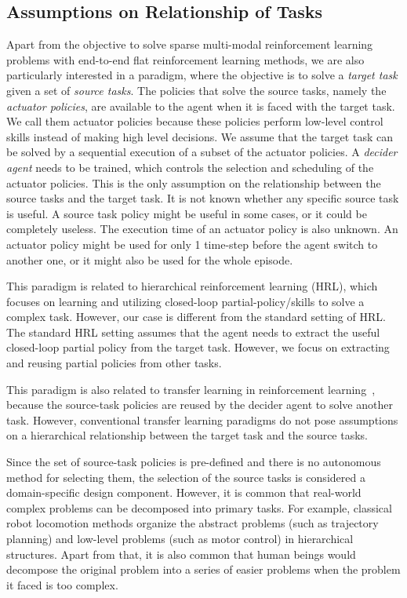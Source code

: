\subsection{Assumptions on Relationship of Tasks}
Apart from the objective to solve sparse multi-modal reinforcement learning problems with end-to-end flat reinforcement learning methods, we are also particularly interested in a paradigm, where the objective is to solve a \textit{target task} given a set of \textit{source tasks}. The policies that solve the source tasks, namely the \textit{actuator policies}, are available to the agent when it is faced with the target task. We call them actuator policies because these policies perform low-level control skills instead of making high level decisions. We assume that the target task can be solved by a sequential execution of a subset of the actuator policies. A \textit{decider agent} needs to be trained, which controls the selection and scheduling of the actuator policies. This is the only assumption on the relationship between the source tasks and the target task. It is not known whether any specific source task is useful. A source task policy might be useful in some cases, or it could be completely useless. The execution time of an actuator policy is also unknown. An actuator policy might be used for only 1 time-step before the agent switch to another one, or it might also be used for the whole episode.

This paradigm is related to hierarchical reinforcement learning (HRL), which focuses on learning and utilizing closed-loop partial-policy/skills to solve a complex task. However, our case is different from the standard setting of HRL. The standard HRL setting assumes that the agent needs to extract the useful closed-loop partial policy from the target task. However, we focus on extracting and reusing partial policies from other tasks.

This paradigm is also related to transfer learning in reinforcement learning~\cite{taylor2009transfer}, because the source-task policies are reused by the decider agent to solve another task. However, conventional transfer learning paradigms do not pose assumptions on a hierarchical relationship between the target task and the source tasks.


Since the set of source-task policies is pre-defined and there is no autonomous method for selecting them, the selection of the source tasks is considered a domain-specific design component. However, it is common that real-world complex problems can be decomposed into primary tasks. For example, classical robot locomotion methods organize the abstract problems (such as trajectory planning) and low-level problems (such as motor control) in hierarchical structures. Apart from that, it is also common that human beings would decompose the original problem into a series of easier problems when the problem it faced is too complex.

